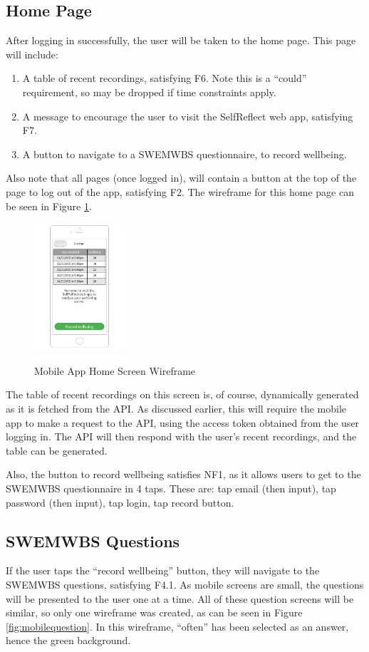 \documentclass[11pt,openright,a4paper]{report}
\begin{document}
\subsection{Home Page}
After logging in successfully, the user will be taken to the home page. This page will include:
\begin{enumerate}
\item A table of recent recordings, satisfying F6. Note this is a \enquote{could} requirement, so may be dropped if time constraints apply.
\item A message to encourage the user to visit the SelfReflect web app, satisfying F7.
\item A button to navigate to a SWEMWBS questionnaire, to record wellbeing.
\end{enumerate}

Also note that all pages (once logged in), will contain a button at the top of the page to log out of the app, satisfying F2. The wireframe for this home page can be seen in Figure \ref{fig:mobilehome}.

\begin{figure}[ht]
\centering
\caption{Mobile App Home Screen Wireframe}
\includegraphics[width=0.3\textwidth]{i/mobilehome.png}
\label{fig:mobilehome}
\end{figure}

The table of recent recordings on this screen is, of course, dynamically generated as it is fetched from the API. As discussed earlier, this will require the mobile app to make a request to the API, using the access token obtained from the user logging in. The API will then respond with the user's recent recordings, and the table can be generated.

Also, the button to record wellbeing satisfies NF1, as it allows users to get to the SWEMWBS questionnaire in 4 taps. These are: tap email (then input), tap password (then input), tap login, tap record button.

\subsection{SWEMWBS Questions}
If the user taps the \enquote{record wellbeing} button, they will navigate to the SWEMWBS questions, satisfying F4.1. As mobile screens are small, the questions will be presented to the user one at a time. All of these question screens will be similar, so only one wireframe was created, as can be seen in Figure \ref{fig:mobilequestion}. In this wireframe, \enquote{often} has been selected as an answer, hence the green background.
\end{document}
